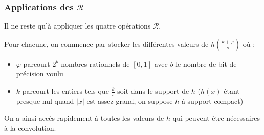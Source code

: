 	\subsubsection{Applications des $\mathcal R$}
		
		Il ne reste qu'à appliquer les quatre opérations $\mathcal R$.
		
		Pour chacune, on commence par stocker les différentes valeurs de $h(\frac{k+\varphi}{s})$ où :
		\begin{itemize}
		\item $\varphi$ parcourt $2^b$ nombres rationnels de $[0,1]$ avec $b$ le nombre de bit de précision voulu
		\item $k$ parcourt les entiers tels que $\frac{k}{s}$ soit dans le support de $h$ ($h(x)$ étant presque nul quand $|x|$ est assez grand, on suppose $h$ à support compact)
		\end{itemize}
		On a ainsi accès rapidement à toutes les valeurs de $h$ qui peuvent être nécessaires à la convolution.
